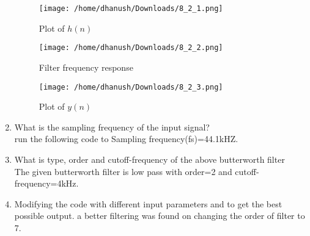 \documentclass[journal,12pt,twocolumn]{IEEEtran}
\renewcommand\thesection{\arabic{section}}
\begin{document}
\begin{enumerate}[label=\thesection.\arabic*]
	
	\begin{figure}[!htb]
		\texttt{[image: /home/dhanush/Downloads/8\_2\_1.png]}
		\caption{Plot of $h(n)$}
		\label{fig:butter-imp}
	\end{figure}
	
	\begin{figure}[!htb]
		\texttt{[image: /home/dhanush/Downloads/8\_2\_2.png]}
		\caption{Filter frequency response}
		\label{fig:butter-resp}
	\end{figure}
	
	\begin{figure}[!htb]
		\texttt{[image: /home/dhanush/Downloads/8\_2\_3.png]}
		\caption{Plot of $y(n)$}
		\label{fig:butter-out}
	\end{figure}
	
	\item What is the sampling frequency of the input signal?
	\\
	\solution run the following code to 
	Sampling frequency(fs)=44.1kHZ.
	\item
	What is type, order and  cutoff-frequency of the above butterworth filter
	\\
	\solution
	The given butterworth filter is low pass with order=2 and cutoff-frequency=4kHz.
	\item
	Modifying the code with different input parameters and to get the best possible output.
	\solution a better filtering was found on changing the order of filter to 7.
\end{enumerate}
\end{document}

